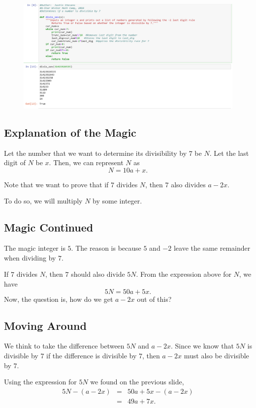 \clearpage

\begin{figure}[h]
	\centering\includegraphics[width=1\linewidth]{images/seven.png}
\end{figure}
\clearpage

\subsection{Explanation of the Magic}

Let the number that we want to determine its divisibility by $7$ be $N$.  Let the last digit of $N$ be $x$.  Then, we can represent $N$ as $$N=10a+x.$$  

Note that we want to prove that if $7$ divides $N$, then $7$ also divides $a-2x$.  

To do so, we will multiply $N$ by some integer.
\clearpage
\subsection*{Magic Continued}

The magic integer is $5$. The reason is because $5$ and $-2$ leave the same remainder when dividing by $7$.

If $7$ divides $N$, then $7$ should also divide $5N$.  From the expression above for $N$, we have $$5N=50a+5x.$$  Now, the question is, how do we get $a-2x$ out of this?  

\subsection*{Moving Around}

We think to take the difference between $5N$ and $a-2x$.  Since we know that $5N$ is divisible by $7$ if the difference is divisible by $7$, then $a-2x$ must also be divisible by $7$.

Using the expression for $5N$ we found on the previous slide, \begin{eqnarray*} 5N-(a-2x) &=& 50a+5x-(a-2x) \\ &=& 49a+7x. \end{eqnarray*}

